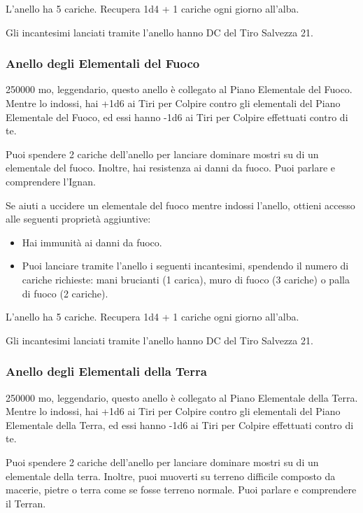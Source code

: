 \begin{multicols}{2}
L'anello ha 5 cariche. Recupera 1d4 + 1 cariche ogni giorno all'alba.

Gli incantesimi lanciati tramite l'anello hanno DC del Tiro Salvezza 21.


\subsubsection*{Anello degli Elementali del Fuoco}
250000 mo, leggendario, questo anello è collegato al Piano Elementale del Fuoco. Mentre lo indossi, hai +1d6 ai Tiri per Colpire contro gli elementali del Piano Elementale del Fuoco, ed essi hanno -1d6 ai Tiri per Colpire effettuati contro di te.

Puoi spendere 2 cariche dell'anello per lanciare dominare mostri su di un elementale del fuoco. Inoltre, hai resistenza ai danni da fuoco. Puoi parlare e comprendere l'Ignan.

Se aiuti a uccidere un elementale del fuoco mentre indossi l'anello, ottieni accesso alle seguenti proprietà aggiuntive:

\medskip

\begin{itemize}
\item
Hai immunità ai danni da fuoco.
\item
Puoi lanciare tramite l'anello i seguenti incantesimi, spendendo il numero di cariche richieste: mani brucianti (1 carica), muro di fuoco (3 cariche) o palla di fuoco (2 cariche).
\end{itemize}

\medskip

L'anello ha 5 cariche. Recupera 1d4 + 1 cariche ogni giorno all'alba.

Gli incantesimi lanciati tramite l'anello hanno DC del Tiro Salvezza 21.

\subsubsection*{Anello degli Elementali della Terra}
250000 mo, leggendario, questo anello è collegato al Piano Elementale della Terra. Mentre lo indossi, hai +1d6 ai Tiri per Colpire contro gli elementali del Piano Elementale della Terra, ed essi hanno -1d6 ai Tiri per Colpire effettuati contro di te.

Puoi spendere 2 cariche dell'anello per lanciare dominare mostri su di un elementale della terra. Inoltre, puoi muoverti su terreno difficile composto da macerie, pietre o terra come se fosse terreno normale. Puoi parlare e comprendere il Terran.


\end{multicols}
